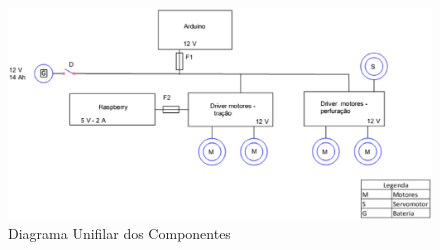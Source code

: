 \begin{itemize}
     \begin{figure}[!htbp]
     \begin{center}
     \includegraphics[keepaspectratio=true,scale=0.6]{figuras/diagramaunifilar.eps}
     \caption{\label{diagramaunifilar}Diagrama Unifilar dos Componentes}
     \end{center}
     \end{figure}

  \end{itemize}
